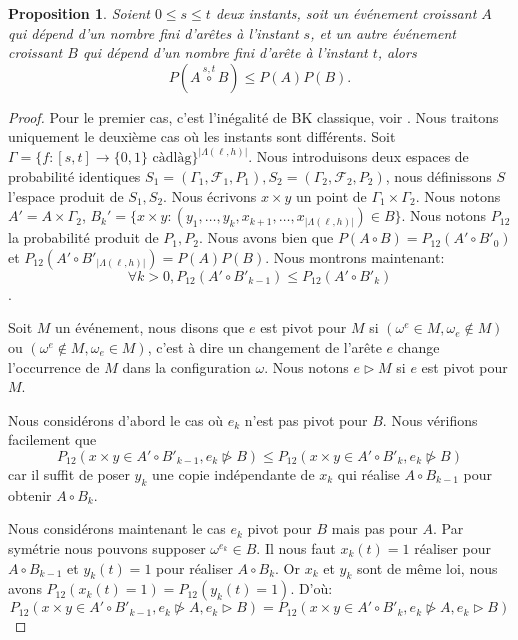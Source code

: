 \documentclass[titlepage,a4paper,12pt]{article}
\newcounter{prop}
\newtheorem{bk}[prop]{Proposition}
\begin{document}
\begin{bk}
Soient $0 \leqslant s \leqslant t$ deux instants, soit un événement croissant $A$ qui dépend d'un nombre fini d'arêtes à l'instant $s$, et un autre événement croissant $B$ qui dépend d'un nombre fini d'arête à l'instant $t$, alors $$P(A\overset{s,t}{\circ}B) \leqslant P(A)P(B).$$
\end{bk}

\begin{proof}
Pour le premier cas, c'est l'inégalité de BK classique, voir \cite{grimmett1999percolation}. Nous traitons uniquement le deuxième cas où les instants sont différents. Soit $\Gamma = \{f:[s,t]\rightarrow\{0,1\}\text{ càdlàg} \}^{|\Lambda(\ell,h)|}$. Nous introduisons deux espaces de probabilité identiques $S_1 = (\Gamma_1,\mathcal{F}_1,P_1), S_2 = (\Gamma_2,\mathcal{F}_2,P_2)$, nous définissons $S$ l'espace produit de $S_1,S_2$. Nous écrivons $x\times y$ un point de $\Gamma_1 \times \Gamma_2$. Nous notons $A' = A\times \Gamma_2$, $B_k' = \{x\times y :(y_1,\dots,y_k,x_{k+1},\dots,x_{|\Lambda(\ell,h)|}) \in B\}$. Nous notons $P_{12}$ la probabilité produit de $P_1,P_2$. Nous avons bien que $P(A\circ B) = P_{12}(A'\circ B'_0)$ et $P_{12}(A'\circ B'_{|\Lambda(\ell,h)|}) = P(A)P(B)$. Nous montrons maintenant: $$\forall k>0, P_{12}(A'\circ B'_{k-1}) \leqslant P_{12}(A'\circ B'_k)$$. 

Soit $M$ un événement, nous disons que $e$ est pivot pour $M$ si $(\omega^e \in M, \omega_e\notin M)$ ou $(\omega^e \notin M, \omega_e\in M)$, c'est à dire un changement de l'arête $e$ change l'occurrence de $M$ dans la configuration $\omega$. Nous notons $e\triangleright M$ si $e$ est pivot pour $M$.

Nous considérons d'abord le cas où $e_k$ n'est pas pivot pour $B$. Nous vérifions facilement que 
$$ P_{12}(x\times y \in A'\circ B'_{k-1}, e_k \ntriangleright B) \leqslant P_{12}(x\times y \in A'\circ B'_k,e_k \ntriangleright B)
$$
car il suffit de poser $y_k$ une copie indépendante de $x_k$ qui réalise $A\circ B_{k-1}$ pour obtenir $A\circ B_k$.

Nous considérons maintenant le cas $e_k$ pivot pour $B$ mais pas pour $A$. Par symétrie nous pouvons supposer $ \omega^{e_k}\in B$. Il nous faut $x_k(t)=1$ réaliser pour $A\circ B_{k-1}$ et $y_k(t)= 1$ pour réaliser $A\circ B_k$. Or $x_k$ et $y_k$ sont de même loi, nous avons $P_{12}(x_k(t)=1) = P_{12}(y_k(t)=1)$. D'où:
$$P_{12}(x\times y \in A'\circ B'_{k-1}, e_k \ntriangleright A,e_k \triangleright B) = P_{12}(x\times y \in A'\circ B'_k,e_k \ntriangleright A, e_k \triangleright B)
$$


\end{proof}
\end{document}
